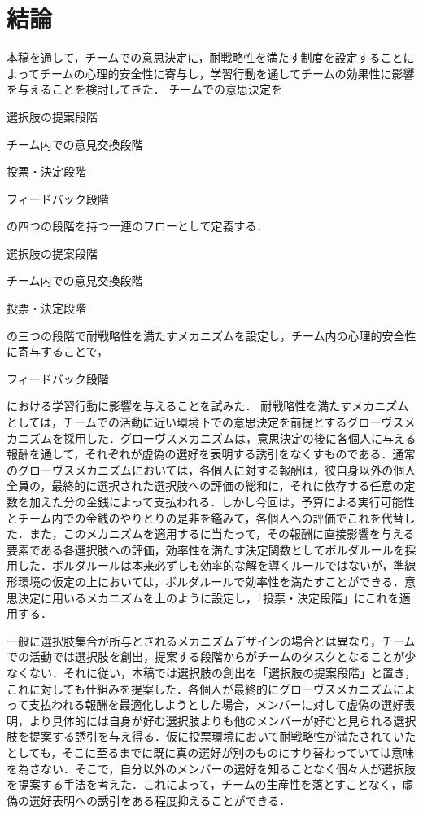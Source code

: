 \documentclass[a4paper, 11pt]{jsarticle}
\begin{document}
\section{結論}
本稿を通して，チームでの意思決定に，耐戦略性を満たす制度を設定することによってチームの心理的安全性に寄与し，学習行動を通してチームの効果性に影響を与えることを検討してきた．
チームでの意思決定を
\begin{inparaenum}[1)]
  \item 選択肢の提案段階
  \item チーム内での意見交換段階
  \item 投票・決定段階
  \item フィードバック段階
\end{inparaenum}
の四つの段階を持つ一連のフローとして定義する．
\begin{inparaenum}[1)]
  \item 選択肢の提案段階
  \item チーム内での意見交換段階
  \item 投票・決定段階
\end{inparaenum}
の三つの段階で耐戦略性を満たすメカニズムを設定し，チーム内の心理的安全性に寄与することで， 
\begin{inparaenum}[4)]
  \item フィードバック段階
\end{inparaenum}
における学習行動に影響を与えることを試みた．
耐戦略性を満たすメカニズムとしては，チームでの活動に近い環境下での意思決定を前提とするグローヴスメカニズムを採用した．グローヴスメカニズムは，意思決定の後に各個人に与える報酬を通して，それぞれが虚偽の選好を表明する誘引をなくすものである．通常のグローヴスメカニズムにおいては，各個人に対する報酬は，彼自身以外の個人全員の，最終的に選択された選択肢への評価の総和に，それに依存する任意の定数を加えた分の金銭によって支払われる．しかし今回は，予算による実行可能性とチーム内での金銭のやりとりの是非を鑑みて，各個人への評価でこれを代替した．また，このメカニズムを適用するに当たって，その報酬に直接影響を与える要素である各選択肢への評価，効率性を満たす決定関数としてボルダルールを採用した．ボルダルールは本来必ずしも効率的な解を導くルールではないが，準線形環境の仮定の上においては，ボルダルールで効率性を満たすことができる．意思決定に用いるメカニズムを上のように設定し，「投票・決定段階」にこれを適用する．

一般に選択肢集合が所与とされるメカニズムデザインの場合とは異なり，チームでの活動では選択肢を創出，提案する段階からがチームのタスクとなることが少なくない．それに従い，本稿では選択肢の創出を「選択肢の提案段階」と置き，これに対しても仕組みを提案した．各個人が最終的にグローヴスメカニズムによって支払われる報酬を最適化しようとした場合，メンバーに対して虚偽の選好表明，より具体的には自身が好む選択肢よりも他のメンバーが好むと見られる選択肢を提案する誘引を与え得る．仮に投票環境において耐戦略性が満たされていたとしても，そこに至るまでに既に真の選好が別のものにすり替わっていては意味を為さない．そこで，自分以外のメンバーの選好を知ることなく個々人が選択肢を提案する手法を考えた．これによって，チームの生産性を落とすことなく，虚偽の選好表明への誘引をある程度抑えることができる．
\end{document}
